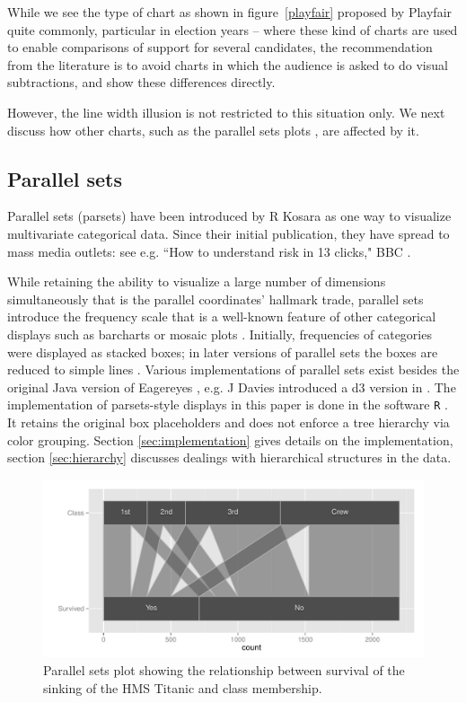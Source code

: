 While we see the type of chart as shown in figure~\ref{playfair} proposed by Playfair quite commonly, particular in election years -- where these kind of charts are used to enable comparisons of support for several candidates, the recommendation from the literature is to avoid charts in which the audience is asked to do visual subtractions, and show these differences directly.

However, the line width illusion is not restricted to this situation only. We next discuss how other charts, such as the parallel sets plots \citep{kosara:2006}, are affected by it.


\subsection{Parallel sets}


Parallel sets (parsets) have been introduced by R Kosara \citep{kosara:2006} as one way to visualize multivariate categorical data. Since their initial publication, they have spread to mass media outlets: see e.g. 
``How to understand risk in 13 clicks," BBC \citep{bbc:2009}.

  While retaining the %
ability to visualize a large number of dimensions simultaneously that is the parallel coordinates' hallmark trade, parallel sets introduce the frequency scale that is a well-known feature of other categorical displays such as barcharts or mosaic plots \citep{hartigan:1981, friendly:1992, hofmann:2000, theus:1997}.
 Initially, frequencies of categories  were displayed as stacked boxes; in  later versions of parallel sets the boxes are reduced to simple lines \citep{parsetredesign}. Various implementations of parallel sets exist besides the original Java version of Eagereyes \citep{eagereyes}, e.g.  J Davies introduced a d3 \citep{d3} version in  \citep{davies}.  The implementation of parsets-style displays in this paper is done in the software {\tt R} \citep{R}. It retains the original box placeholders and does not enforce a tree hierarchy via color grouping. Section \ref{sec:implementation} gives details on the implementation, section \ref{sec:hierarchy} discusses dealings with hierarchical structures in the data.



\begin{figure}[hbtp]
\centering
\includegraphics[width=.9\linewidth]{images/parset-titanic}
\caption{\label{question1a} Parallel sets plot showing the relationship between survival of the sinking of the HMS Titanic and class membership. }
\end{figure}


